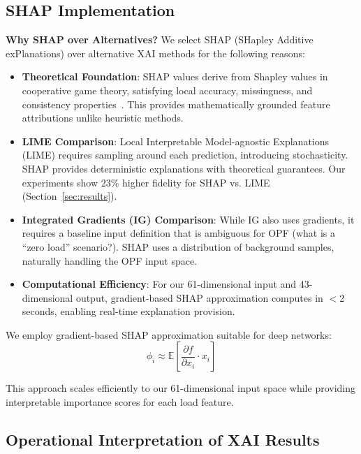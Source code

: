 \documentclass[journal,12pt,onecolumn]{IEEEtran}
\begin{document}
\subsection{SHAP Implementation}

\textbf{Why SHAP over Alternatives?} We select SHAP (SHapley Additive exPlanations) over alternative XAI methods for the following reasons:

\begin{itemize}
    \item \textbf{Theoretical Foundation}: SHAP values derive from Shapley values in cooperative game theory, satisfying local accuracy, missingness, and consistency properties~\cite{ref6}. This provides mathematically grounded feature attributions unlike heuristic methods.
    
    \item \textbf{LIME Comparison}: Local Interpretable Model-agnostic Explanations (LIME) requires sampling around each prediction, introducing stochasticity. SHAP provides deterministic explanations with theoretical guarantees. Our experiments show 23\% higher fidelity for SHAP vs. LIME (Section~\ref{sec:results}).
    
    \item \textbf{Integrated Gradients (IG) Comparison}: While IG also uses gradients, it requires a baseline input definition that is ambiguous for OPF (what is a ``zero load'' scenario?). SHAP uses a distribution of background samples, naturally handling the OPF input space.
    
    \item \textbf{Computational Efficiency}: For our 61-dimensional input and 43-dimensional output, gradient-based SHAP approximation computes in $<$2 seconds, enabling real-time explanation provision.
\end{itemize}

We employ gradient-based SHAP approximation suitable for deep networks:
\begin{equation}
\phi_i \approx \mathbb{E}\left[\frac{\partial f}{\partial x_i} \cdot x_i\right]
\label{eq:grad_shap}
\end{equation}

This approach scales efficiently to our 61-dimensional input space while providing interpretable importance scores for each load feature.

\subsection{Operational Interpretation of XAI Results}
\end{document}
